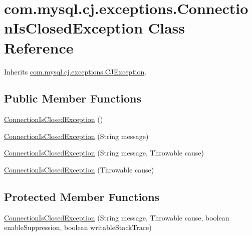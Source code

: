 \hypertarget{classcom_1_1mysql_1_1cj_1_1exceptions_1_1_connection_is_closed_exception}{}\section{com.\+mysql.\+cj.\+exceptions.\+Connection\+Is\+Closed\+Exception Class Reference}
\label{classcom_1_1mysql_1_1cj_1_1exceptions_1_1_connection_is_closed_exception}


Inherits \mbox{\hyperlink{classcom_1_1mysql_1_1cj_1_1exceptions_1_1_c_j_exception}{com.\+mysql.\+cj.\+exceptions.\+C\+J\+Exception}}.

\subsection*{Public Member Functions}
\begin{DoxyCompactItemize}
\item 
\mbox{\hyperlink{classcom_1_1mysql_1_1cj_1_1exceptions_1_1_connection_is_closed_exception_af3e8b4284447f77a2766d72eb2a83355}{Connection\+Is\+Closed\+Exception}} ()
\item 
\mbox{\hyperlink{classcom_1_1mysql_1_1cj_1_1exceptions_1_1_connection_is_closed_exception_a1090e3bca62a1f7b588c1a36f811686f}{Connection\+Is\+Closed\+Exception}} (String message)
\item 
\mbox{\hyperlink{classcom_1_1mysql_1_1cj_1_1exceptions_1_1_connection_is_closed_exception_a35314af9b05207fb9ee585c3eb300086}{Connection\+Is\+Closed\+Exception}} (String message, Throwable cause)
\item 
\mbox{\hyperlink{classcom_1_1mysql_1_1cj_1_1exceptions_1_1_connection_is_closed_exception_a28917930dc54fa25234fdaff0340bb5b}{Connection\+Is\+Closed\+Exception}} (Throwable cause)
\end{DoxyCompactItemize}
\subsection*{Protected Member Functions}
\begin{DoxyCompactItemize}
\item 
\mbox{\hyperlink{classcom_1_1mysql_1_1cj_1_1exceptions_1_1_connection_is_closed_exception_a02e0a106b5dacc40096467a3ce9d1273}{Connection\+Is\+Closed\+Exception}} (String message, Throwable cause, boolean enable\+Suppression, boolean writable\+Stack\+Trace)
\end{DoxyCompactItemize}

